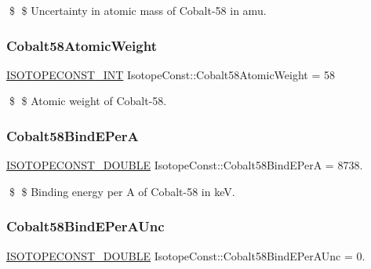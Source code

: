\$ \$ Uncertainty in atomic mass of Cobalt-\/58 in amu. \mbox{\label{group___isotope_const-_cobalt-_co58_ga1a1daae30f93199e5fe02bae170a324c}} 
\subsubsection{\texorpdfstring{Cobalt58\+Atomic\+Weight}{Cobalt58AtomicWeight}}
{\footnotesize\ttfamily \mbox{\hyperlink{group___isotope_const-_macros_ga5f18360b3e99483a35c32d789e62621c}{I\+S\+O\+T\+O\+P\+E\+C\+O\+N\+S\+T\+\_\+\+I\+NT}} Isotope\+Const\+::\+Cobalt58\+Atomic\+Weight = 58}

\$ \$ Atomic weight of Cobalt-\/58. \mbox{\label{group___isotope_const-_cobalt-_co58_ga3c19c9774cc61c8d1bc23f1d5ab40c81}} 
\subsubsection{\texorpdfstring{Cobalt58\+Bind\+E\+PerA}{Cobalt58BindEPerA}}
{\footnotesize\ttfamily \mbox{\hyperlink{group___isotope_const-_macros_ga8f45a7272ce02c0b4c65c44636ed719a}{I\+S\+O\+T\+O\+P\+E\+C\+O\+N\+S\+T\+\_\+\+D\+O\+U\+B\+LE}} Isotope\+Const\+::\+Cobalt58\+Bind\+E\+PerA = 8738.}

\$ \$ Binding energy per A of Cobalt-\/58 in keV. \mbox{\label{group___isotope_const-_cobalt-_co58_gaca8847c4cec7106acba6d56a927ebd5f}} 
\subsubsection{\texorpdfstring{Cobalt58\+Bind\+E\+Per\+A\+Unc}{Cobalt58BindEPerAUnc}}
{\footnotesize\ttfamily \mbox{\hyperlink{group___isotope_const-_macros_ga8f45a7272ce02c0b4c65c44636ed719a}{I\+S\+O\+T\+O\+P\+E\+C\+O\+N\+S\+T\+\_\+\+D\+O\+U\+B\+LE}} Isotope\+Const\+::\+Cobalt58\+Bind\+E\+Per\+A\+Unc = 0.}

